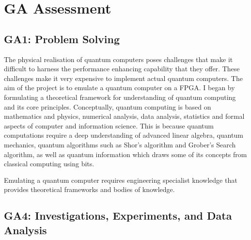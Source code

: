 \chapter{\label{app:myappendix}GA Assessment}

\section{\label{app:sec:myappendix}GA1: Problem Solving}

The physical realisation of quantum computers poses challenges that make it difficult to harness the performance enhancing capability that they offer.  These challenges make it very expensive to implement actual quantum computers. The aim of the project is to emulate a quantum computer on a FPGA. I began by formulating a theoretical framework for understanding of quantum computing and its core principles. Conceptually, quantum computing is based on mathematics and physics, numerical analysis, data analysis, statistics and formal aspects of computer and information science. This is because quantum computations require a deep understanding of advanced linear algebra, quantum mechanics,  quantum algorithms such as Shor’s algorithm and Grober’s Search algorithm, as well as quantum information which draws some of its concepts from classical computing using bits.

Emulating a quantum computer requires engineering specialist knowledge that provides theoretical frameworks and bodies of knowledge.

\section{GA4: Investigations, Experiments, and Data Analysis}

